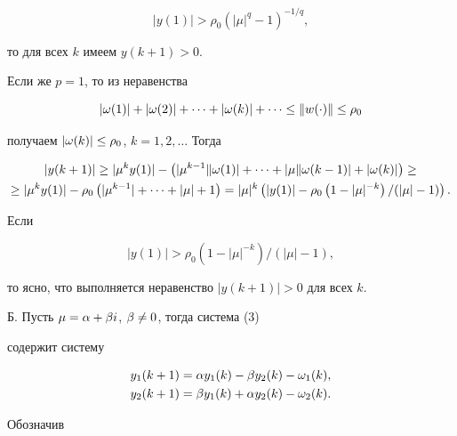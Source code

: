 \begin{pf}
$$


|y(1)| > \rho_0 \left(|\mu|^q - 1\right)^{-1/q},


$$


то для всех $k $ имеем $y(k+1) > 0$.





Если же $p = 1$, то из неравенства


$$


|\w(1)| + |\w(2)| + \dotsb + |\w(k)| + \dotsb \leq \|w(\cc)\| \leq


\rho_0


$$


получаем $|\omega(k)| \leq \rho_0$, $k = 1, 2,\dotsc$ Тогда


\begin{gather*}


|y(k+1)| \geq |\mu^ky(1)| - \left(|\mu^{k-1}\|\w(1)| + \dotsb +


|\mu\|\w(k-1)| + |\w(k)|\right) \geq \\


%


\geq |\mu^ky(1)| - \rho_0 \left(|\mu^{k-1}| + \dotsb +


|\mu| + 1\right) = |\mu|^k\left(|y(1)| -


\rho_0\left(1-|\mu|^{-k}\right)/(|\mu|-1)\right).


\end{gather*}


Если


$$


|y(1)| > \rho_0 \left(1-|\mu|^{-k}\right)/(|\mu|-1),


$$


то ясно, что выполняется неравенство $|y(k+1)| > 0$ для всех $k$.


\medskip





Б. Пусть $\mu = \alpha + \beta i$, $\beta \neq 0$, тогда система (3)


содержит систему


\begin{align*}


y_1(k+1) &= \a y_1(k) - \b y_2(k) - \w_1(k),\\


y_2(k+1) &= \b y_1(k) + \a y_2(k) - \w_2(k).


\end{align*}


Обозначив


$$



\end{pf}
